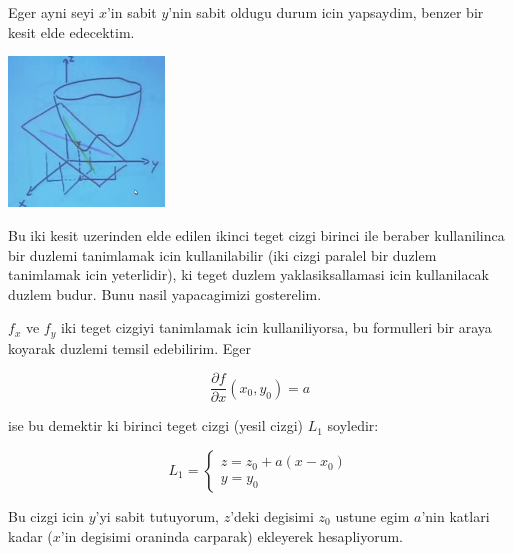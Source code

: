 \documentclass[12pt,fleqn]{article}
\begin{document}
Eger ayni seyi $x$'in sabit $y$'nin sabit oldugu durum icin yapsaydim,
benzer bir kesit elde edecektim. 

\includegraphics[height=4cm]{9_2.png}

Bu iki kesit uzerinden elde edilen ikinci teget cizgi birinci ile beraber
kullanilinca bir duzlemi tanimlamak icin kullanilabilir (iki cizgi paralel
bir duzlem tanimlamak icin yeterlidir), ki teget duzlem yaklasiksallamasi
icin kullanilacak duzlem budur. Bunu nasil yapacagimizi gosterelim.

$f_x$ ve $f_y$ iki teget cizgiyi tanimlamak icin kullaniliyorsa, bu
formulleri bir araya koyarak duzlemi temsil edebilirim. Eger

\[ \frac{\partial f}{\partial x}(x_0,y_0) = a \]

ise bu demektir ki birinci teget cizgi (yesil cizgi) $L_1$ soyledir:

\[ 
L_1 = 
\left\{ \begin{array}{l}
z = z_0 + a(x - x_0) \\
y = y_0
\end{array} \right.
 \]

Bu cizgi icin $y$'yi sabit tutuyorum, $z$'deki degisimi $z_0$ ustune egim
$a$'nin katlari kadar ($x$'in degisimi oraninda carparak) ekleyerek
hesapliyorum. 
\end{document}
